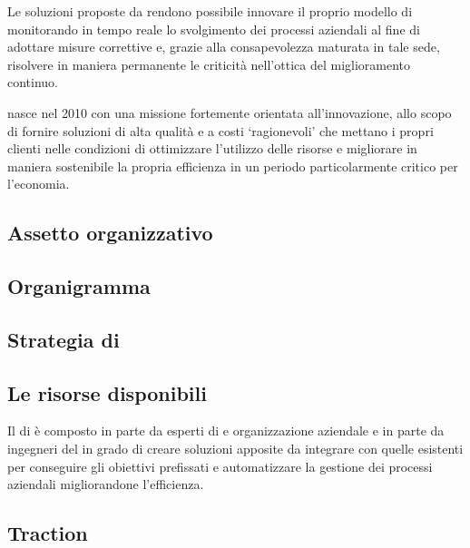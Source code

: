 Le soluzioni proposte da \team rendono possibile innovare il proprio modello di \bsn monitorando in tempo reale lo svolgimento dei processi aziendali al fine di adottare misure correttive  e, grazie alla consapevolezza maturata in tale sede, risolvere in maniera permanente le criticità nell'ottica del miglioramento continuo.

\team nasce nel 2010 con una missione fortemente orientata all'innovazione, allo scopo di fornire soluzioni \sw di alta qualità e a costi `ragionevoli' che mettano i propri clienti nelle condizioni di ottimizzare l'utilizzo delle risorse e migliorare in maniera sostenibile la propria efficienza in un periodo particolarmente critico per l'economia.

\subsection{Assetto organizzativo}

\subsection{Organigramma}

\begin{figure}[h]
\centering

\end{figure}

\subsection{Strategia di }

\subsection{Le risorse disponibili}
Il  di \team è composto in parte da esperti di \bsn {} e organizzazione aziendale e in parte da ingegneri del \sw in grado di creare soluzioni apposite da integrare con quelle esistenti per conseguire gli obiettivi prefissati e automatizzare la gestione dei processi aziendali migliorandone l'efficienza.

\subsection{Traction}

